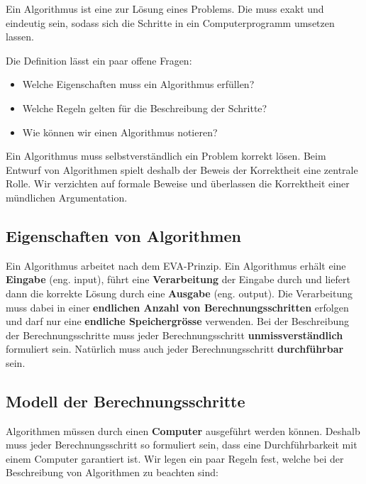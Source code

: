 \begin{definition}[Algorithmus]
	Ein Algorithmus ist eine  zur Lösung eines Problems. Die  muss exakt und eindeutig sein, sodass sich die Schritte in ein Computerprogramm umsetzen lassen.
\end{definition}

Die Definition lässt ein paar offene Fragen:

\begin{itemize}
	\item Welche Eigenschaften muss ein Algorithmus erfüllen?
	\item Welche Regeln gelten für die Beschreibung der Schritte?
	\item Wie können wir einen Algorithmus notieren?
\end{itemize}

\begin{important}
	Ein Algorithmus muss selbstverständlich ein Problem korrekt lösen. Beim Entwurf von Algorithmen spielt deshalb der Beweis der Korrektheit eine zentrale Rolle. Wir verzichten auf formale Beweise und überlassen die Korrektheit einer mündlichen Argumentation.
\end{important}

\subsection{Eigenschaften von Algorithmen}

Ein Algorithmus arbeitet nach dem \ac{EVA}-Prinzip. Ein Algorithmus erhält eine \textbf{Eingabe} (eng. input), führt eine \textbf{Verarbeitung} der Eingabe durch und liefert dann die korrekte Lösung durch eine \textbf{Ausgabe} (eng. output). Die Verarbeitung muss dabei in einer \textbf{endlichen Anzahl von Berechnungsschritten} erfolgen und darf nur eine \textbf{endliche Speichergrösse} verwenden. Bei der Beschreibung der Berechnungsschritte muss jeder Berechnungsschritt \textbf{unmissverständlich} formuliert sein. Natürlich muss auch jeder Berechnungsschritt \textbf{durchführbar} sein.

\subsection{Modell der Berechnungsschritte}

Algorithmen müssen durch einen \textbf{Computer} ausgeführt werden können. Deshalb muss jeder Berechnungsschritt so formuliert sein, dass eine Durchführbarkeit mit einem Computer garantiert ist. Wir legen ein paar Regeln fest, welche bei der Beschreibung von Algorithmen zu beachten sind:

